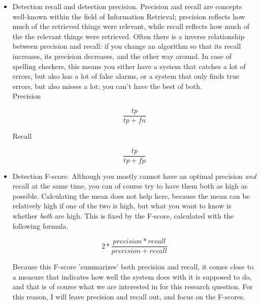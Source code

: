 \documentclass[12pt]{article}
\begin{document}
\begin{itemize}
\item Detection recall and detection precision. 
Precision and recall are concepts well-known within the field of Information Retrieval; precision reflects how much of the retrieved things were relevant, while recall reflects how much of the the relevant things were retrieved. Often there is a inverse relationship between precision and recall: if you change an algorithm so that its recall increases, its precision decreases, and the other way around. In case of spelling checkers, this means you either have a system that catches a lot of errors, but also has a lot of false alarms, or a system that only finds true errors, but also misses a lot; you can't have the best of both. \\

Precision

\[
\frac{tp}{tp+fn}
\]

Recall

\[
\frac{tp}{tp+fp}
\]

\item Detection F-score. 
Although you mostly cannot have an optimal precision \emph{and} recall at the same time, you can of course try to have them both as high as possible. Calculating the mean does not help here, because the mean can be relatively high if one of the two is high, but what you want to know is whether \emph{both} are high. This is fixed by the F-score, calculated with the following formula.

\[
2 * \frac{precision * recall}{precision + recall}
\]

Because this F-score 'summarizes' both precision and recall, it comes close to a measure that indicates how well the system does with it is supposed to do, and that is of course what we are interested in for this research question. For this reason, I will leave precision and recall out, and focus on the F-scores.

\end{itemize}
\end{document}
